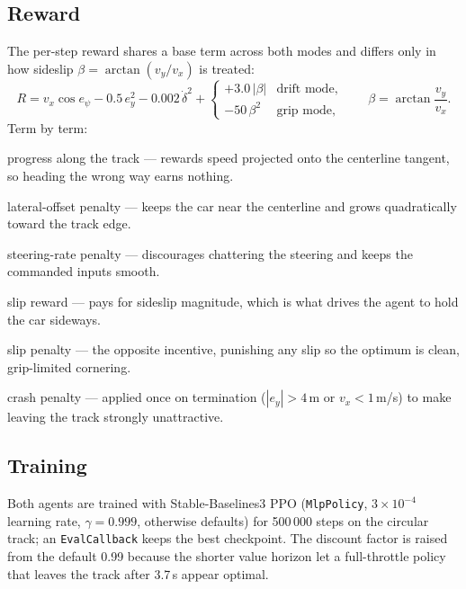 \documentclass[11pt]{article}
\begin{document}
\subsection{Reward}
The per-step reward shares a base term across both modes and differs only
in how sideslip $\beta = \arctan(v_y/v_x)$ is treated:
\begin{equation}
R = v_x\cos e_\psi - 0.5\,e_y^2 - 0.002\,\dot{\delta}^2 +
\begin{cases}
+3.0\,|\beta| & \text{drift mode},\\[2pt]
-50\,\beta^2 & \text{grip mode},
\end{cases}
\qquad \beta = \arctan\frac{v_y}{v_x}.
\end{equation}
Term by term:
\begin{description}[nosep, itemsep=2pt]
\item[$+v_x\cos e_\psi$] progress along the track --- rewards speed
projected onto the centerline tangent, so heading the wrong way earns
nothing.
\item[$-0.5\,e_y^2$] lateral-offset penalty --- keeps the car near the
centerline and grows quadratically toward the track edge.
\item[$-0.002\,\dot{\delta}^2$] steering-rate penalty --- discourages
chattering the steering and keeps the commanded inputs smooth.
\item[$+3.0\,|\beta|$ (drift)] slip reward --- pays for sideslip
magnitude, which is what drives the agent to hold the car sideways.
\item[$-50\,\beta^2$ (grip)] slip penalty --- the opposite incentive,
punishing any slip so the optimum is clean, grip-limited cornering.
\item[$-400$ (terminal)] crash penalty --- applied once on termination
($|e_y| > 4$\,m or $v_x < 1$\,m/s) to make leaving the track strongly
unattractive.
\end{description}

\subsection{Training}
Both agents are trained with Stable-Baselines3 PPO (\texttt{MlpPolicy},
$3\times10^{-4}$ learning rate, $\gamma = 0.999$, otherwise defaults) for
500\,000 steps on the circular track; an \texttt{EvalCallback} keeps the
best checkpoint. The discount factor is raised from the default 0.99
because the shorter value horizon let a full-throttle policy that leaves
the track after 3.7\,s appear optimal.
\end{document}
